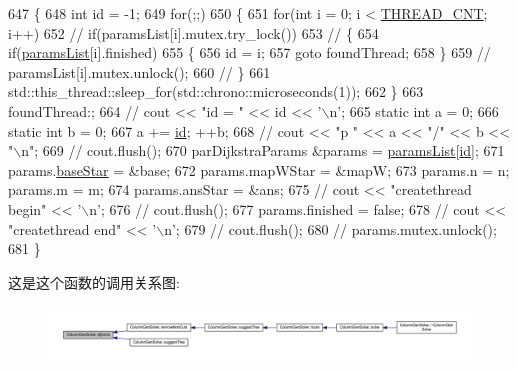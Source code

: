 \begin{DoxyCode}
647 \{
648     \textcolor{keywordtype}{int} \textcolor{keywordtype}{id} = -1;
649     \textcolor{keywordflow}{for}(;;)
650     \{
651         \textcolor{keywordflow}{for}(\textcolor{keywordtype}{int} i = 0; i < \hyperlink{classColumnGenSolve_a6ead284bdba22a11e3b84eb873807e23}{THREAD\_CNT}; i++)
652             \textcolor{comment}{// if(paramsList[i].mutex.try\_lock())}
653             \textcolor{comment}{// \{}
654                 \textcolor{keywordflow}{if}(\hyperlink{classColumnGenSolve_aba2e5f0dc752db74718e834faf9ef606}{paramsList}[i].finished)
655                 \{
656                     \textcolor{keywordtype}{id} = i;
657                     \textcolor{keywordflow}{goto} foundThread;
658                 \}
659                 \textcolor{comment}{// paramsList[i].mutex.unlock();}
660             \textcolor{comment}{// \}}
661         std::this\_thread::sleep\_for(std::chrono::microseconds(1));
662     \}
663     foundThread:;
664     \textcolor{comment}{// cout << "id = " << id << '\(\backslash\)n';}
665     \textcolor{keyword}{static} \textcolor{keywordtype}{int} a = 0;
666     \textcolor{keyword}{static} \textcolor{keywordtype}{int} b = 0;
667     a += \hyperlink{classes_8txt_a7441ef0865bcb3db9b8064dd7375c1ea}{id}; ++b;
668     \textcolor{comment}{// cout << "p " << a << "/" << b << "\(\backslash\)n";}
669     \textcolor{comment}{// cout.flush();}
670     parDijkstraParams &params = \hyperlink{classColumnGenSolve_aba2e5f0dc752db74718e834faf9ef606}{paramsList}[\hyperlink{classes_8txt_a7441ef0865bcb3db9b8064dd7375c1ea}{id}];
671     params.\hyperlink{structColumnGenSolve_1_1parDijkstraParams_a6d66ec75238960aaf04d2d62058ea077}{baseStar} = &base;
672     params.mapWStar = &mapW;
673     params.n = n; params.m = m;
674     params.ansStar = &ans;
675     \textcolor{comment}{// cout << "createthread begin" << '\(\backslash\)n';}
676     \textcolor{comment}{// cout.flush();}
677     params.finished = \textcolor{keyword}{false};
678     \textcolor{comment}{// cout << "createthread end" << '\(\backslash\)n';}
679     \textcolor{comment}{// cout.flush();}
680     \textcolor{comment}{// params.mutex.unlock();}
681 \}
\end{DoxyCode}


这是这个函数的调用关系图\+:
\nopagebreak
\begin{figure}[H]
\begin{center}
\leavevmode
\includegraphics[width=350pt]{classColumnGenSolve_a71007959556061091171c03da6197f34_icgraph}
\end{center}
\end{figure}


